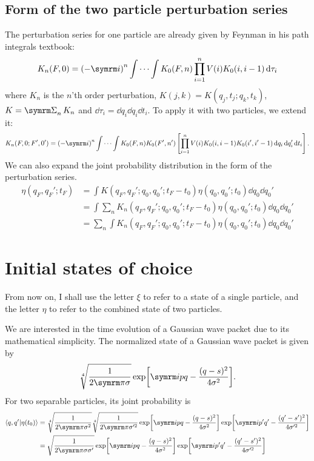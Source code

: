 \subsection{Form of the two particle perturbation series}

The perturbation series for one particle are already given by Feynman in his path integrals textbook:
\begin{equation}
    K_n(F, 0) = \left(-\im\right)^n\idotsint K_0(F, n)\prod_{i = 1}^n V(i)K_0(i, i - 1)\dd{\tau_i}
\end{equation}
where $K_n$ is the $n$'th order perturbation, $K(j, k) = K(q_j, t_j; q_k, t_k)$, $K = \ssum_nK_n$ and $\dd{\tau_i} = \dd{q_i}\dd{q_i}\dd{t_i}$. To apply it with two particles, we extend it:
\begin{equation}
    K_n(F, 0; F', 0') = \left(-\im\right)^n\idotsint K_0(F, n)K_0(F', n')\left[\prod_{i = 1}^nV(i)K_0(i, i - 1)K_0(i', i' - 1)\dd{q_i}\dd{q_i'}\dd{t_i}\right]. \label{eq:generaltwoparticleperturbation}
\end{equation}
We can also expand the joint probability distribution in the form of the perturbation series.
\begin{align}
    \eta(q_F, q_F'; t_F) &= \int K(q_F, q_F'; q_0, q_0'; t_F - t_0)\eta(q_0, q_0'; t_0)\dd{q_0}\dd{q_0'} \\
    &= \int \sum_n K_n(q_F, q_F'; q_0, q_0'; t_F - t_0)\eta(q_0, q_0'; t_0) \dd{q_0}\dd{q_0'} \\
    &= \sum_n \int K_n(q_F, q_F'; q_0, q_0'; t_F - t_0)\eta(q_0, q_0'; t_0) \dd{q_0}\dd{q_0'}
\end{align}

\section{Initial states of choice}
\label{sec:initial_states_of_choice}

From now on, I shall use the letter $\xi$ to refer to a state of a single particle, and the letter $\eta$ to refer to the combined state of two particles.

We are interested in the time evolution of a Gaussian wave packet due to its mathematical simplicity. The normalized state of a Gaussian wave packet is given by
\begin{equation}
    \sqrt[4]{\frac{1}{2\cpi\sigma}}\exp[\im p q - \frac{(q - s)^2}{4\sigma^2}]. \label{eq:unentangled_state}
\end{equation}
For two separable particles, its joint probability is
\begin{align}
    \braket{q, q'}{\eta(t_0)} &= \sqrt[4]{\frac{1}{2\cpi\sigma^2}}\sqrt[4]{\frac{1}{2\cpi\sigma'^2}}\exp[\im pq - \frac{(q - s)^2}{4\sigma^2}]\exp[\im p'q' - \frac{(q' - s')^2}{4\sigma'^2}] \\
    &= \sqrt{\frac{1}{2\cpi\sigma\sigma'}}\exp[\im pq - \frac{(q - s)^2}{4\sigma^2}]\exp[\im p'q' - \frac{(q' - s')^2}{4\sigma'^2}]
\end{align}

